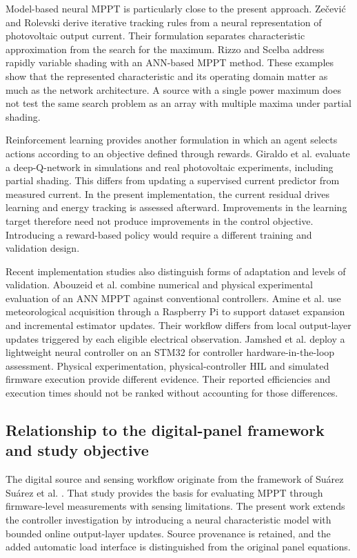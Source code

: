 Model-based neural MPPT is particularly close to the present approach. Zečević and Rolevski \cite{nnmodel} derive iterative tracking rules from a neural representation of photovoltaic output current. Their formulation separates characteristic approximation from the search for the maximum. Rizzo and Scelba \cite{rizzo} address rapidly variable shading with an ANN-based MPPT method. These examples show that the represented characteristic and its operating domain matter as much as the network architecture. A source with a single power maximum does not test the same search problem as an array with multiple maxima under partial shading.

Reinforcement learning provides another formulation in which an agent selects actions according to an objective defined through rewards. Giraldo et al. \cite{giraldo} evaluate a deep-Q-network in simulations and real photovoltaic experiments, including partial shading. This differs from updating a supervised current predictor from measured current. In the present implementation, the current residual drives learning and energy tracking is assessed afterward. Improvements in the learning target therefore need not produce improvements in the control objective. Introducing a reward-based policy would require a different training and validation design.

Recent implementation studies also distinguish forms of adaptation and levels of validation. Abouzeid et al. \cite{abouzeid} combine numerical and physical experimental evaluation of an ANN MPPT against conventional controllers. Amine et al. \cite{amine} use meteorological acquisition through a Raspberry Pi to support dataset expansion and incremental estimator updates. Their workflow differs from local output-layer updates triggered by each eligible electrical observation. Jamshed et al. \cite{jamshed} deploy a lightweight neural controller on an STM32 for controller hardware-in-the-loop assessment. Physical experimentation, physical-controller HIL and simulated firmware execution provide different evidence. Their reported efficiencies and execution times should not be ranked without accounting for those differences.

\subsection{Relationship to the digital-panel framework and study objective}
The digital source and sensing workflow originate from the framework of Suárez Suárez et al. \cite{suarez}. That study provides the basis for evaluating MPPT through firmware-level measurements with sensing limitations. The present work extends the controller investigation by introducing a neural characteristic model with bounded online output-layer updates. Source provenance is retained, and the added automatic load interface is distinguished from the original panel equations.

